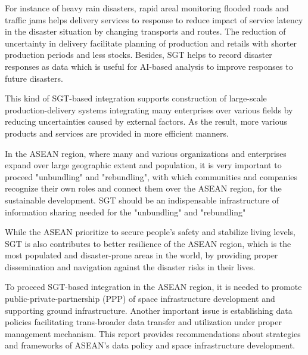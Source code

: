 For instance of heavy rain disasters, rapid areal monitoring flooded roads and traffic jams helps delivery services to response to reduce impact of service latency in the disaster situation by changing transports and routes. The reduction of uncertainty in delivery facilitate planning of production and retails with shorter production periods and less stocks.
Besides, SGT helps to record disaster responses as data which is useful for AI-based analysis to improve responses to future disasters.

This kind of SGT-based integration supports construction of large-scale production-delivery systems integrating many enterprises over various fields by reducing uncertainties caused by external factors. As the result, more various products and services are provided in more efficient manners.

In the ASEAN region, where many and various organizations and enterprises expand over large geographic extent and population, it is very important to proceed "unbundling" and "rebundling", with which communities and companies recognize their own roles and connect them over the ASEAN region, for the sustainable development. SGT should be an indispensable infrastructure of information sharing needed for the "unbundling" and "rebundling"

While the ASEAN prioritize to secure people's safety and stabilize living levels, SGT is also contributes to better resilience of the ASEAN region, which is the most populated and disaster-prone areas in the world, by providing proper dissemination and navigation against the disaster risks in their lives.

To proceed SGT-based integration in the ASEAN region, it is needed to promote public-private-partnership (PPP) of space infrastructure development and supporting ground infrastructure. Another important issue is establishing data policies facilitating trans-broader data transfer and utilization under proper management mechanism. This report provides recommendations about strategies and frameworks of ASEAN's data policy and space infrastructure development.

